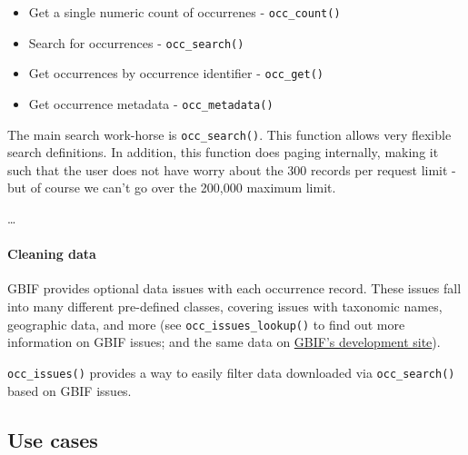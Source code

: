 \documentclass[author-year, review, 11pt]{components/elsarticle} %
\newenvironment{Shaded}{\begin{snugshade}}{\end{snugshade}}
\newcommand{\KeywordTok}[1]{\textcolor[rgb]{0.13,0.29,0.53}{\textbf{{#1}}}}
\newcommand{\DataTypeTok}[1]{\textcolor[rgb]{0.13,0.29,0.53}{{#1}}}
\newcommand{\DecValTok}[1]{\textcolor[rgb]{0.00,0.00,0.81}{{#1}}}
\newcommand{\StringTok}[1]{\textcolor[rgb]{0.31,0.60,0.02}{{#1}}}
\newcommand{\CommentTok}[1]{\textcolor[rgb]{0.56,0.35,0.01}{\textit{{#1}}}}
\newcommand{\NormalTok}[1]{{#1}}
\begin{document}
\begin{itemize}
\itemsep1pt\parskip0pt
\item
  Get a single numeric count of occurrenes - \texttt{occ\_count()}
\item
  Search for occurrences - \texttt{occ\_search()}
\item
  Get occurrences by occurrence identifier - \texttt{occ\_get()}
\item
  Get occurrence metadata - \texttt{occ\_metadata()}
\end{itemize}

The main search work-horse is \texttt{occ\_search()}. This function
allows very flexible search definitions. In addition, this function does
paging internally, making it such that the user does not have worry
about the 300 records per request limit - but of course we can't go over
the 200,000 maximum limit.

\ldots{}

\paragraph{Cleaning data}\label{cleaning-data}

GBIF provides optional data issues with each occurrence record. These
issues fall into many different pre-defined classes, covering issues
with taxonomic names, geographic data, and more (see
\texttt{occ\_issues\_lookup()} to find out more information on GBIF
issues; and the same data on
\href{http://gbif.github.io/gbif-api/apidocs/org/gbif/api/vocabulary/OccurrenceIssue.html}{GBIF's
development site}).

\texttt{occ\_issues()} provides a way to easily filter data downloaded
via \texttt{occ\_search()} based on GBIF issues.

\begin{Shaded}
\end{Shaded}

\subsection{Use cases}\label{use-cases}
\end{document}
